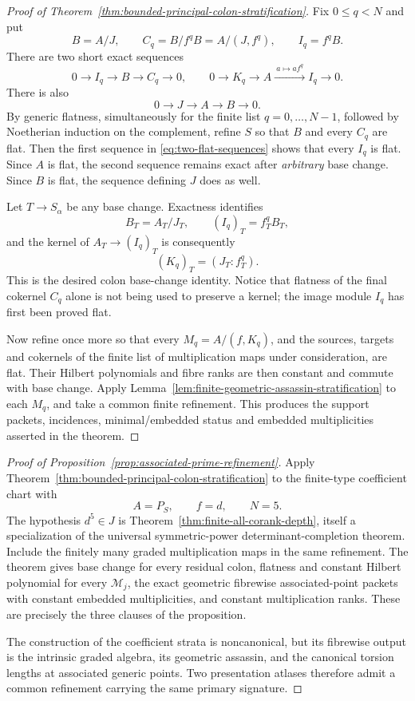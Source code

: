 \begin{proof}[Proof of Theorem~\ref{thm:bounded-principal-colon-stratification}]
Fix \(0\le q<N\) and put
\[
 B=A/J,\qquad C_q=B/f^qB=A/(J,f^q),\qquad
 I_q=f^qB.
\]
There are two short exact sequences
\begin{equation}\label{eq:two-flat-sequences}
 0\longrightarrow I_q\longrightarrow B\longrightarrow C_q
 \longrightarrow0,
 \qquad
 0\longrightarrow K_q\longrightarrow A
 \xrightarrow{\ a\mapsto af^q\ } I_q\longrightarrow0.
\end{equation}
There is also
\[
 0\longrightarrow J\longrightarrow A\longrightarrow B\longrightarrow0.
\]
By generic flatness, simultaneously for the finite list
\(q=0,\ldots,N-1\), followed by Noetherian induction on the
complement, refine \(S\) so that \(B\) and every \(C_q\) are flat.
Then the first sequence in \eqref{eq:two-flat-sequences} shows that
every \(I_q\) is flat.  Since \(A\) is flat, the second sequence
remains exact after \emph{arbitrary} base change.  Since \(B\) is
flat, the sequence defining \(J\) does as well.

Let \(T\to S_\alpha\) be any base change.  Exactness identifies
\[
 B_T=A_T/J_T,\qquad
 (I_q)_T=f_T^qB_T,
\]
and the kernel of \(A_T\to(I_q)_T\) is consequently
\[
 (K_q)_T=(J_T:f_T^q).
\]
This is the desired colon base-change identity.  Notice that flatness
of the final cokernel \(C_q\) alone is not being used to preserve a
kernel; the image module \(I_q\) has first been proved flat.

Now refine once more so that every
\(M_q=A/(f,K_q)\), and the sources, targets and cokernels of the
finite list of multiplication maps under consideration, are flat.
Their Hilbert polynomials and fibre ranks are then constant and commute
with base change.  Apply
Lemma~\ref{lem:finite-geometric-assassin-stratification} to each
\(M_q\), and take a common finite refinement.  This produces the
support packets, incidences, minimal/embedded status and embedded
multiplicities asserted in the theorem.
\end{proof}

\begin{proof}[Proof of Proposition~\ref{prop:associated-prime-refinement}]
Apply Theorem~\ref{thm:bounded-principal-colon-stratification} to the
finite-type coefficient chart with
\[
 A=P_S,\qquad f=d,\qquad N=5.
\]
The hypothesis \(d^5\in J\) is
Theorem~\ref{thm:finite-all-corank-depth}, itself a specialization of
the universal symmetric-power determinant-completion theorem.
Include the finitely many graded multiplication maps in the same
refinement.  The theorem gives base change for every residual colon,
flatness and constant Hilbert polynomial for every \(\mathcal M_j\),
the exact geometric fibrewise associated-point packets with constant
embedded multiplicities, and constant multiplication ranks.  These
are precisely the three clauses of the proposition.

The construction of the coefficient strata is noncanonical, but its
fibrewise output is the intrinsic graded algebra, its geometric
assassin, and the canonical torsion lengths at associated generic
points.  Two presentation atlases therefore admit a common refinement
carrying the same primary signature.
\end{proof}

